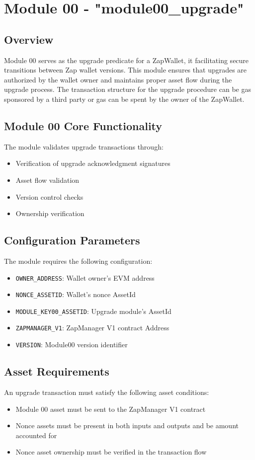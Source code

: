 \newpage
\section{Module 00 - {\ttfamily "module00\_upgrade"}}
\label{sec:module00_predicate}

\subsection{Overview}
Module 00 serves as the upgrade predicate for a ZapWallet, it facilitating secure transitions between Zap wallet versions. This
module ensures that upgrades are authorized by the wallet owner and maintains proper asset flow during the upgrade process. The
transaction structure for the upgrade procedure can be gas sponsored by a third party or gas can be spent by the owner of the ZapWallet.

\subsection{Module 00 Core Functionality}
The module validates upgrade transactions through:
\begin{itemize}
    \item Verification of upgrade acknowledgment signatures
    \item Asset flow validation
    \item Version control checks
    \item Ownership verification
\end{itemize}


\subsection{Configuration Parameters}
The module requires the following configuration:
\begin{itemize}
    \item \texttt{OWNER\_ADDRESS}: Wallet owner's EVM address
    \item \texttt{NONCE\_ASSETID}: Wallet's nonce AssetId
    \item \texttt{MODULE\_KEY00\_ASSETID}: Upgrade module's AssetId
    \item \texttt{ZAPMANAGER\_V1}: ZapManager V1 contract Address
    \item \texttt{VERSION}: Module00 version identifier
\end{itemize}



\subsection{Asset Requirements}
An upgrade transaction must satisfy the following asset conditions:
\begin{itemize}
    \item Module 00 asset must be sent to the ZapManager V1 contract
    \item Nonce assets must be present in both inputs and outputs and be amount accounted for
    \item Nonce asset ownership must be verified in the transaction flow
\end{itemize}

